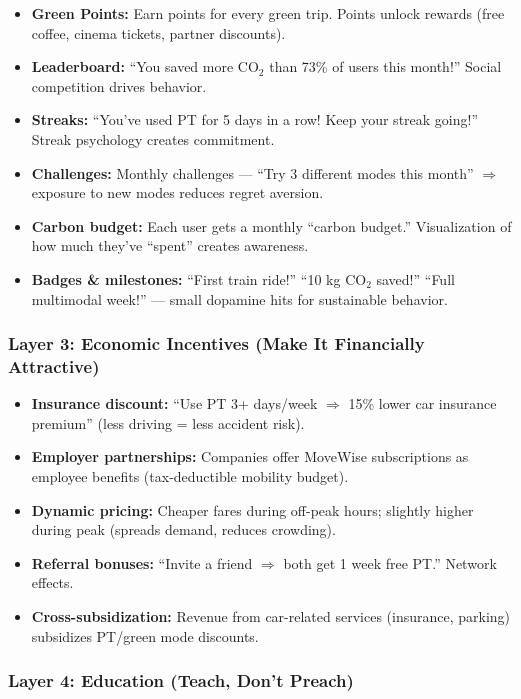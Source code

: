 \documentclass[11pt,a4paper]{article}
\begin{document}
\begin{itemize}[noitemsep]
    \item \textbf{Green Points:} Earn points for every green trip. Points unlock rewards (free coffee, cinema tickets, partner discounts).
    \item \textbf{Leaderboard:} ``You saved more CO$_2$ than 73\% of users this month!'' Social competition drives behavior.
    \item \textbf{Streaks:} ``You've used PT for 5 days in a row! Keep your streak going!'' Streak psychology creates commitment.
    \item \textbf{Challenges:} Monthly challenges --- ``Try 3 different modes this month'' $\Rightarrow$ exposure to new modes reduces regret aversion.
    \item \textbf{Carbon budget:} Each user gets a monthly ``carbon budget.'' Visualization of how much they've ``spent'' creates awareness.
    \item \textbf{Badges \& milestones:} ``First train ride!'' ``10 kg CO$_2$ saved!'' ``Full multimodal week!'' --- small dopamine hits for sustainable behavior.
\end{itemize}

\subsubsection{Layer 3: Economic Incentives (Make It Financially Attractive)}

\begin{itemize}[noitemsep]
    \item \textbf{Insurance discount:} ``Use PT 3+ days/week $\Rightarrow$ 15\% lower car insurance premium'' (less driving = less accident risk).
    \item \textbf{Employer partnerships:} Companies offer MoveWise subscriptions as employee benefits (tax-deductible mobility budget).
    \item \textbf{Dynamic pricing:} Cheaper fares during off-peak hours; slightly higher during peak (spreads demand, reduces crowding).
    \item \textbf{Referral bonuses:} ``Invite a friend $\Rightarrow$ both get 1 week free PT.'' Network effects.
    \item \textbf{Cross-subsidization:} Revenue from car-related services (insurance, parking) subsidizes PT/green mode discounts.
\end{itemize}

\subsubsection{Layer 4: Education (Teach, Don't Preach)}
\end{document}
